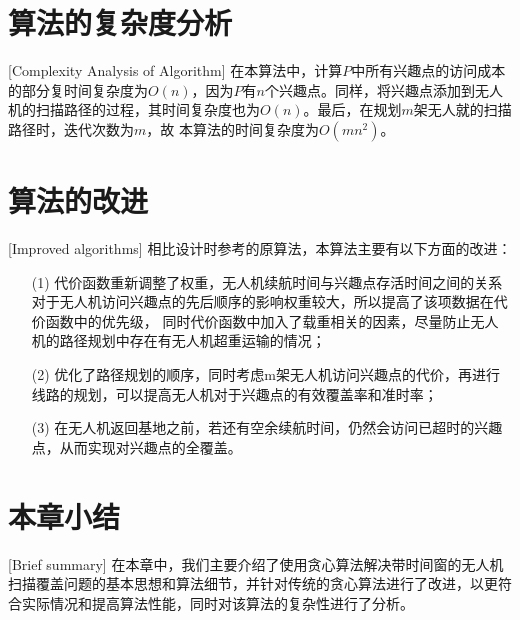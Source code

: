 \section{算法的复杂度分析}[Complexity Analysis of Algorithm]
在本算法中，计算$P$中所有兴趣点的访问成本的部分复时间复杂度为$O(n)$，因为$P$有$n$个兴趣点。同样，将兴趣点添加到无人机的扫描路径的过程，其时间复杂度也为$O(n)$。最后，在规划$m$架无人就的扫描路径时，迭代次数为$m$，故
本算法的时间复杂度为$O(mn^2)$。

\section{算法的改进}[Improved algorithms]
相比设计时参考的原算法，本算法主要有以下方面的改进：
\begin{itemize}
	\item [(1)] 代价函数重新调整了权重，无人机续航时间与兴趣点存活时间之间的关系对于无人机访问兴趣点的先后顺序的影响权重较大，所以提高了该项数据在代价函数中的优先级，
	同时代价函数中加入了载重相关的因素，尽量防止无人机的路径规划中存在有无人机超重运输的情况；
	\item [(2)] 优化了路径规划的顺序，同时考虑m架无人机访问兴趣点的代价，再进行线路的规划，可以提高无人机对于兴趣点的有效覆盖率和准时率；
	\item [(3)] 在无人机返回基地之前，若还有空余续航时间，仍然会访问已超时的兴趣点，从而实现对兴趣点的全覆盖。
\end{itemize}

\section{本章小结}[Brief summary]
在本章中，我们主要介绍了使用贪心算法解决带时间窗的无人机扫描覆盖问题的基本思想和算法细节，并针对传统的贪心算法进行了改进，以更符合实际情况和提高算法性能，同时对该算法的复杂性进行了分析。